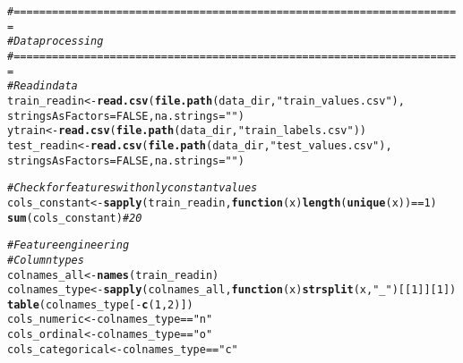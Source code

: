 \documentclass{article}\usepackage[]{graphicx}\usepackage[]{color}
\makeatletter
\newcommand{\hlnum}[1]{\textcolor[rgb]{0.686,0.059,0.569}{#1}}%
\newcommand{\hlstr}[1]{\textcolor[rgb]{0.192,0.494,0.8}{#1}}%
\newcommand{\hlcom}[1]{\textcolor[rgb]{0.678,0.584,0.686}{\textit{#1}}}%
\newcommand{\hlopt}[1]{\textcolor[rgb]{0,0,0}{#1}}%
\newcommand{\hlstd}[1]{\textcolor[rgb]{0.345,0.345,0.345}{#1}}%
\newcommand{\hlkwa}[1]{\textcolor[rgb]{0.161,0.373,0.58}{\textbf{#1}}}%
\newcommand{\hlkwb}[1]{\textcolor[rgb]{0.69,0.353,0.396}{#1}}%
\newcommand{\hlkwc}[1]{\textcolor[rgb]{0.333,0.667,0.333}{#1}}%
\newcommand{\hlkwd}[1]{\textcolor[rgb]{0.737,0.353,0.396}{\textbf{#1}}}%
\newenvironment{kframe}{%
 \def\at@end@of@kframe{}%
 \ifinner\ifhmode%
  \def\at@end@of@kframe{\end{minipage}}%
  \begin{minipage}{\columnwidth}%
 \fi\fi%
 \def\FrameCommand##1{\hskip\@totalleftmargin \hskip-\fboxsep
 \colorbox{shadecolor}{##1}\hskip-\fboxsep
     \hskip-\linewidth \hskip-\@totalleftmargin \hskip\columnwidth}%
 \MakeFramed {\advance\hsize-\width
   \@totalleftmargin\z@ \linewidth\hsize
   \@setminipage}}%
 {\par\unskip\endMakeFramed%
 \at@end@of@kframe}
\newenvironment{knitrout}{}{} %
\makeatother
\begin{document}
\begin{knitrout}
\color{fgcolor}\begin{kframe}
\begin{alltt}
\hlcom{#======================================================================}
\hlcom{# Data processing}
\hlcom{#======================================================================}
\hlcom{# Read in data}
\hlstd{train_readin} \hlkwb{<-} \hlkwd{read.csv}\hlstd{(}\hlkwd{file.path}\hlstd{(data_dir,} \hlstr{"train_values.csv"}\hlstd{),}
                         \hlkwc{stringsAsFactors} \hlstd{=} \hlnum{FALSE}\hlstd{,} \hlkwc{na.strings} \hlstd{=} \hlstr{""}\hlstd{)}
\hlstd{ytrain} \hlkwb{<-} \hlkwd{read.csv}\hlstd{(}\hlkwd{file.path}\hlstd{(data_dir,} \hlstr{"train_labels.csv"}\hlstd{))}
\hlstd{test_readin} \hlkwb{<-} \hlkwd{read.csv}\hlstd{(}\hlkwd{file.path}\hlstd{(data_dir,} \hlstr{"test_values.csv"}\hlstd{),}
                        \hlkwc{stringsAsFactors} \hlstd{=} \hlnum{FALSE}\hlstd{,} \hlkwc{na.strings} \hlstd{=} \hlstr{""}\hlstd{)}

\hlcom{# Check for features with only constant values}
\hlstd{cols_constant} \hlkwb{<-} \hlkwd{sapply}\hlstd{(train_readin,} \hlkwa{function}\hlstd{(}\hlkwc{x}\hlstd{)} \hlkwd{length}\hlstd{(}\hlkwd{unique}\hlstd{(x))} \hlopt{==} \hlnum{1}\hlstd{)}
\hlkwd{sum}\hlstd{(cols_constant)} \hlcom{# 20}

\hlcom{# Feature engineering}
\hlcom{# Column types}
\hlstd{colnames_all} \hlkwb{<-} \hlkwd{names}\hlstd{(train_readin)}
\hlstd{colnames_type} \hlkwb{<-} \hlkwd{sapply}\hlstd{(colnames_all,} \hlkwa{function}\hlstd{(}\hlkwc{x}\hlstd{)} \hlkwd{strsplit}\hlstd{(x,} \hlstr{"_"}\hlstd{)[[}\hlnum{1}\hlstd{]][}\hlnum{1}\hlstd{])}
\hlkwd{table}\hlstd{(colnames_type[}\hlopt{-}\hlkwd{c}\hlstd{(}\hlnum{1}\hlstd{,} \hlnum{2}\hlstd{)])}
\hlstd{cols_numeric} \hlkwb{<-} \hlstd{colnames_type} \hlopt{==} \hlstr{"n"}
\hlstd{cols_ordinal} \hlkwb{<-} \hlstd{colnames_type} \hlopt{==} \hlstr{"o"}
\hlstd{cols_categorical} \hlkwb{<-} \hlstd{colnames_type} \hlopt{==} \hlstr{"c"}


\end{alltt}
\end{kframe}
\end{knitrout}
\end{document}
